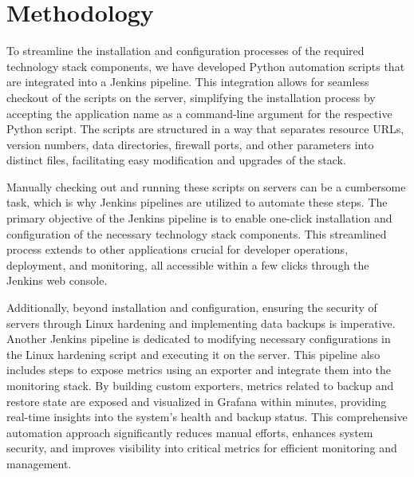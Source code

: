 \documentclass[12pt,a4paper,oneside]{report}
\begin{document}
\newpage
\chapter{Methodology}
\hspace{1cm}To streamline the installation and configuration processes of the required technology stack components, we have developed Python automation scripts that are integrated into a Jenkins pipeline. This integration allows for seamless checkout of the scripts on the server, simplifying the installation process by accepting the application name as a command-line argument for the respective Python script. The scripts are structured in a way that separates resource URLs, version numbers, data directories, firewall ports, and other parameters into distinct files, facilitating easy modification and upgrades of the stack.

Manually checking out and running these scripts on servers can be a cumbersome task, which is why Jenkins pipelines are utilized to automate these steps. The primary objective of the Jenkins pipeline is to enable one-click installation and configuration of the necessary technology stack components. This streamlined process extends to other applications crucial for developer operations, deployment, and monitoring, all accessible within a few clicks through the Jenkins web console.

Additionally, beyond installation and configuration, ensuring the security of servers through Linux hardening and implementing data backups is imperative. Another Jenkins pipeline is dedicated to modifying necessary configurations in the Linux hardening script and executing it on the server. This pipeline also includes steps to expose metrics using an exporter and integrate them into the monitoring stack. By building custom exporters, metrics related to backup and restore state are exposed and visualized in Grafana within minutes, providing real-time insights into the system's health and backup status. This comprehensive automation approach significantly reduces manual efforts, enhances system security, and improves visibility into critical metrics for efficient monitoring and management.
\end{document}
